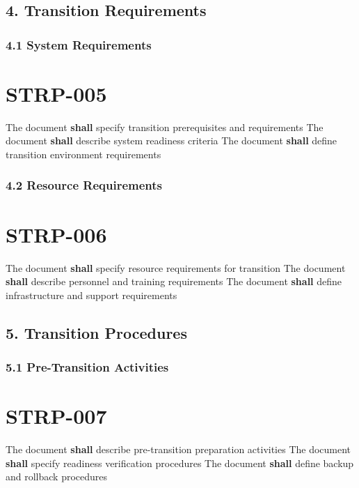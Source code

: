 \subsection{4. Transition Requirements}

\subsubsection{4.1 System Requirements}

\section{STRP-005}\label{STRP-005}

The document \textbf{shall} specify transition prerequisites and requirements
The document \textbf{shall} describe system readiness criteria
The document \textbf{shall} define transition environment requirements

\subsubsection{4.2 Resource Requirements}

\section{STRP-006}\label{STRP-006}

The document \textbf{shall} specify resource requirements for transition
The document \textbf{shall} describe personnel and training requirements
The document \textbf{shall} define infrastructure and support requirements

\subsection{5. Transition Procedures}

\subsubsection{5.1 Pre-Transition Activities}

\section{STRP-007}\label{STRP-007}

The document \textbf{shall} describe pre-transition preparation activities
The document \textbf{shall} specify readiness verification procedures
The document \textbf{shall} define backup and rollback procedures

